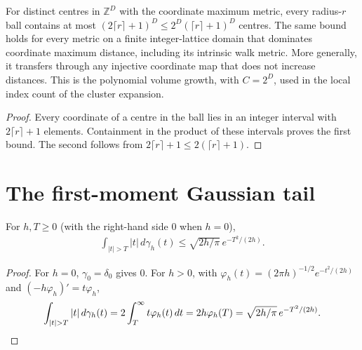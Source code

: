 \begin{lemma}
    \label{lem:hastings_integer_lattice_ball_count}
    \leanok
    For distinct centres in $\mathbb Z^D$ with the coordinate maximum
    metric, every radius-$r$ ball contains at most
    $(2\lceil r\rceil+1)^D\le2^D(\lceil r\rceil+1)^D$ centres.
    The same bound holds for every metric on a finite integer-lattice
    domain that dominates coordinate maximum distance, including its
    intrinsic walk metric. More generally, it transfers through any
    injective coordinate map that does not increase distances.
    This is the polynomial volume growth, with $C=2^D$, used in the local
    index count of the cluster expansion.
\end{lemma}
\begin{proof}\leanok
    Every coordinate of a centre in the ball lies in an integer interval
    with $2\lceil r\rceil+1$ elements. Containment in the product of these
    intervals proves the first bound. The second follows from
    $2\lceil r\rceil+1\le2(\lceil r\rceil+1)$.
\end{proof}


\section{The first-moment Gaussian tail}
\label{sec:gaussian_filtered_gaussian_time_average}

\begin{lemma}
    \label{thm:hastings_gaussian_absolute_moment_tail}
    \leanok
    For $h,T\ge0$ (with the right-hand side $0$ when $h=0$),
    \begin{align}
        \int_{|t|>T}|t|\,d\gamma_h(t)
        \le \sqrt{2h/\pi}\,e^{-T^2/(2h)}.
        \label{eq:hastings_gaussian_absolute_moment_tail}
    \end{align}
\end{lemma}
\begin{proof}\leanok
    For $h=0$, $\gamma_0=\delta_0$ gives $0$. For $h>0$, with
    $\varphi_h(t)=(2\pi h)^{-1/2}e^{-t^2/(2h)}$ and $(-h\varphi_h)'=t\varphi_h$,
    \begin{align}
        \int_{|t|>T}|t|\,d\gamma_h(t)=2\int_T^\infty t\varphi_h(t)\,dt
        =2h\varphi_h(T)=\sqrt{2h/\pi}\,e^{-T^2/(2h)}.
        \notag
    \end{align}
\end{proof}

